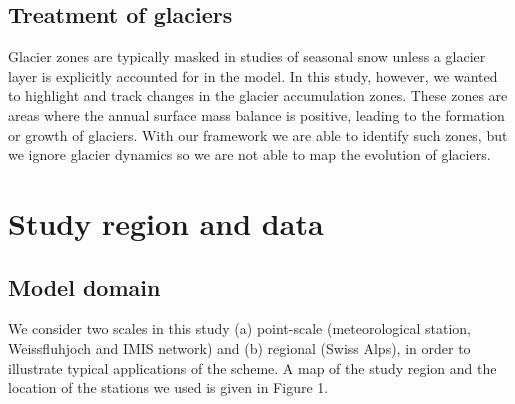 \documentclass[hess, manuscript]{copernicus}
\begin{document}
\subsection{Treatment of glaciers}
Glacier zones are typically masked in studies of seasonal snow unless a glacier layer is explicitly accounted for in the model. 
In this study, however, we wanted to highlight and track changes in the glacier accumulation zones. These zones are areas where the annual surface mass balance is positive, leading to the formation or growth of glaciers. With our framework we are able to identify such zones, but we ignore glacier dynamics so we are not able to map the evolution of glaciers.





\section{Study region and data}
\subsection{Model domain}
We consider two scales in this study (a) point-scale (meteorological station, Weissfluhjoch and IMIS network) and (b) regional (Swiss Alps), in order to illustrate typical applications of the scheme. A map of the study region and the location of the stations we used is given in Figure 1.
\end{document}
